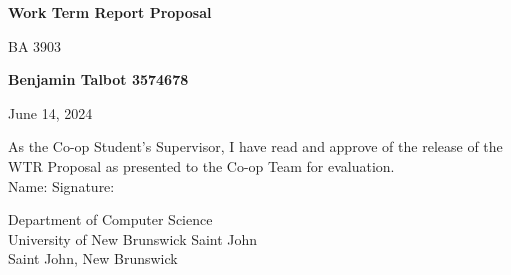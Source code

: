 \begin{titlepage}
    \begin{center}
        \vspace*{1cm}

        \LARGE
        \textbf{Work Term Report Proposal}

        \vspace{0.5cm}
        \Large
        BA 3903

        \vspace{2cm}

        \textbf{Benjamin Talbot 3574678}
        
        \vspace{0.5cm}
        June 14, 2024

        \normalsize
        \vspace{5cm}
        As the Co-op Student's Supervisor, I have read and approve of the release of the WTR Proposal as presented to the Co-op Team for evaluation.\\
        \vspace{0.25cm}
        Name:\underline{\hspace{3cm}} \quad Signature:\underline{\hspace{2.5cm}}

        \vspace{5.5cm}
        Department of Computer Science\\
        University of New Brunswick Saint John\\
        Saint John, New Brunswick\\
        \date{\today}
    \end{center}
\end{titlepage}